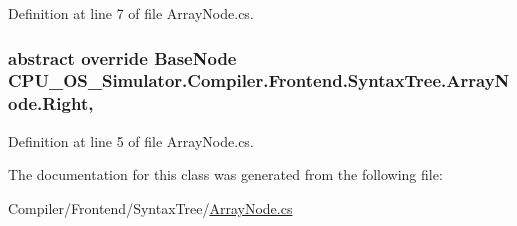 Definition at line 7 of file Array\+Node.\+cs.

\hypertarget{class_c_p_u___o_s___simulator_1_1_compiler_1_1_frontend_1_1_syntax_tree_1_1_array_node_a422bdd9640f912faf3785fdd0b1d1c34}{}
\subsubsection[{Right}]{\setlength{\rightskip}{0pt plus 5cm}abstract override {\bf Base\+Node} C\+P\+U\+\_\+\+O\+S\+\_\+\+Simulator.\+Compiler.\+Frontend.\+Syntax\+Tree.\+Array\+Node.\+Right\hspace{0.3cm}{\ttfamily [get]}, {\ttfamily [set]}}\label{class_c_p_u___o_s___simulator_1_1_compiler_1_1_frontend_1_1_syntax_tree_1_1_array_node_a422bdd9640f912faf3785fdd0b1d1c34}


Definition at line 5 of file Array\+Node.\+cs.



The documentation for this class was generated from the following file\+:\begin{DoxyCompactItemize}
\item 
Compiler/\+Frontend/\+Syntax\+Tree/\hyperlink{_array_node_8cs}{Array\+Node.\+cs}\end{DoxyCompactItemize}
